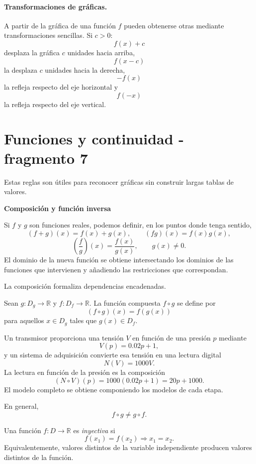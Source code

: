 \paragraph{Transformaciones de gráficas.}
A partir de la gráfica de una función $f$ pueden obtenerse otras mediante transformaciones sencillas. Si $c>0$:
\[
f(x)+c
\]
desplaza la gráfica $c$ unidades hacia arriba,
\[
f(x-c)
\]
la desplaza $c$ unidades hacia la derecha,
\[
-f(x)
\]
la refleja respecto del eje horizontal y
\[
f(-x)
\]
la refleja respecto del eje vertical.


\section{Funciones y continuidad - fragmento 7}
Estas reglas son útiles para reconocer gráficas sin construir largas tablas de valores.

\textbf{Composición y función inversa}

Si $f$ y $g$ son funciones reales, podemos definir, en los puntos donde tenga sentido,
\[
(f+g)(x)=f(x)+g(x),\qquad
(fg)(x)=f(x)g(x),
\]
\[
\left(\frac fg\right)(x)=\frac{f(x)}{g(x)},\qquad g(x)\neq0.
\]
El dominio de la nueva función se obtiene intersectando los dominios de las funciones que intervienen y añadiendo las restricciones que correspondan.

La composición formaliza dependencias encadenadas.

\begin{definition}[Composición]
Sean $g:D_g\to\mathbb{R}$ y $f:D_f\to\mathbb{R}$. La función compuesta $f\circ g$ se define por
\[
(f\circ g)(x)=f(g(x))
\]
para aquellos $x\in D_g$ tales que $g(x)\in D_f$.
\end{definition}

\begin{example}
Un transmisor proporciona una tensión $V$ en función de una presión $p$ mediante
\[
V(p)=0.02p+1,
\]
y un sistema de adquisición convierte esa tensión en una lectura digital
\[
N(V)=1000V.
\]
La lectura en función de la presión es la composición
\[
(N\circ V)(p)=1000(0.02p+1)=20p+1000.
\]
El modelo completo se obtiene componiendo los modelos de cada etapa.
\end{example}

En general,
\[
f\circ g\neq g\circ f.
\]

\begin{definition}
Una función $f:D\to\mathbb{R}$ es \emph{inyectiva} si
\[
f(x_1)=f(x_2)\Longrightarrow x_1=x_2.
\]
Equivalentemente, valores distintos de la variable independiente producen valores distintos de la función.
\end{definition}

